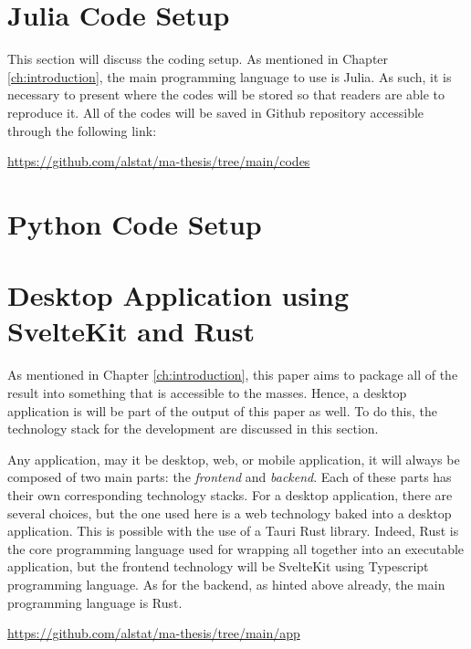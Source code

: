 \section{Julia Code Setup}\label{sec:code_setup}
This section will discuss the coding setup. As mentioned in Chapter \ref{ch:introduction}, the main programming language to use is Julia. As such, it is necessary to present where the codes will be stored so that readers are able to reproduce it. All of the codes will be saved in Github repository accessible through the following link:
\begin{center}
    \url{https://github.com/alstat/ma-thesis/tree/main/codes}
\end{center}
\section{Python Code Setup}\label{sec:py_code_setup}
\section{Desktop Application using SvelteKit and Rust}
As mentioned in Chapter \ref{ch:introduction}, this paper aims to package all of the result into something that is accessible to the masses. Hence, a desktop application is will be part of the output of this paper as well. To do this, the technology stack for the development are discussed in this section. 

Any application, may it be desktop, web, or mobile application, it will always be composed of two main parts: the \textit{frontend} and \textit{backend}. Each of these parts has their own corresponding technology stacks. For a desktop application, there are several choices, but the one used here is a web technology baked into a desktop application. This is possible with the use of a Tauri Rust library. Indeed, Rust is the core programming language used for wrapping all together into an executable application, but the frontend technology will be SvelteKit using Typescript programming language. As for the backend, as hinted above already, the main programming language is Rust.

\begin{center}
    \url{https://github.com/alstat/ma-thesis/tree/main/app}
\end{center}
